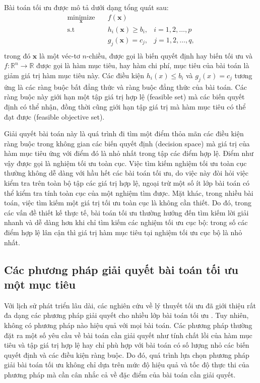 \documentclass[../main.tex]{subfiles}
\begin{document}
Bài toán tối ưu được mô tả dưới dạng tổng quát sau:
\begin{equation}\label{def:opt}
\begin{aligned}
\underset{\mathbf{x}}{\text{minimize}} \quad & f\left(\mathbf{x}\right) \\
\textrm{s.t} \quad & h_i\left(\mathbf{x}\right) \geq b_i, & i=1,2,\dots,p \\
\quad & g_j\left(\mathbf{x}\right) = c_j, & j=1,2,\dots,q,\\
\end{aligned}
\end{equation}
trong đó $\mathbf{x}$ là một véc-tơ $n$-chiều, được gọi là biến quyết định hay biến tối ưu và $f: \mathbb{R}^n \rightarrow \mathbb{R}$ được gọi là hàm mục tiêu, hay hàm chi phí, mục tiêu của bài toán là giảm giá trị hàm mục tiêu này. Các điều kiện $h_i(x) \leq b_i$ và $g_j(x)=c_j$ tương ứng là các ràng buộc bất đẳng thức và ràng buộc đẳng thức của bài toán. Các ràng buộc này giới hạn một tập giá trị hợp lệ (feasible set) mà các biến quyết định có thể nhận, đồng thời cũng giới hạn tập giá trị mà hàm mục tiêu có thể đạt được (feasible objective set).

Giải quyết bài toán này là quá trình đi tìm một điểm thỏa mãn các điều kiện ràng buộc trong không gian các biến quyết định (decision space) mà giá trị của hàm mục tiêu ứng với điểm đó là nhỏ nhất trong tập các điểm hợp lệ. Điểm như vậy được gọi là nghiệm tối ưu toàn cục. Việc tìm kiếm nghiệm tối ưu toàn cục thường không dễ dàng với hầu hết các bài toán tối ưu, do việc này đòi hỏi việc kiểm tra trên toàn bộ tập các giá trị hợp lệ, ngoại trừ một số ít lớp bài toán có thể kiểm tra tính toàn cục của một nghiệm tìm được. Mặt khác, trong nhiều bài toán, việc tìm kiếm một giá trị tối ưu toàn cục là không cần thiết. Do đó, trong các vấn đề thiết kế thực tế, bài toán tối ưu thường hướng đến tìm kiếm lời giải nhanh và dễ dàng hơn khi chỉ tìm kiếm các nghiệm tối ưu cục bộ: trong số các điểm hợp lệ lân cận thì giá trị hàm mục tiêu tại nghiệm tối ưu cục bộ là nhỏ nhất.

\subsection{Các phương pháp giải quyết bài toán tối ưu một mục tiêu}

Với lịch sử phát triển lâu dài, các nghiên cứu về lý thuyết tối ưu đã giới thiệu rất đa dạng các phương pháp giải quyết cho nhiều lớp bài toán tối ưu \cite{10.5555/3351864}. Tuy nhiên, không có phương pháp nào hiệu quả với mọi bài toán. Các phương pháp thường đặt ra một số yêu cầu về bài toán cần giải quyết như tính chất lồi của hàm mục tiêu và tập giá trị hợp lệ \cite{boyd2004convex} hay chỉ phù hợp với bài toán có số lượng nhỏ các biến quyết định và các điều kiện ràng buộc. Do đó, quá trình lựa chọn phương pháp giải bài toán tối ưu không chỉ dựa trên mức độ hiệu quả và tốc độ thực thi của phương pháp mà cần cân nhắc cả về đặc điểm của bài toán cần giải quyết.
\end{document}
